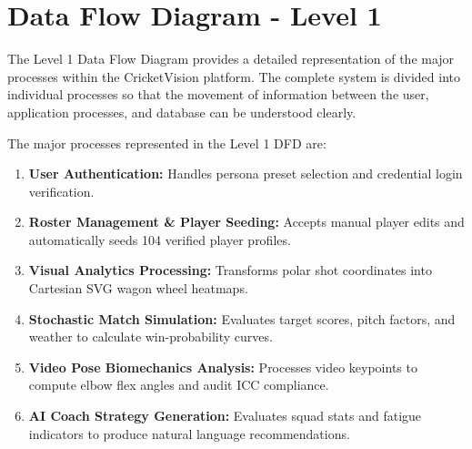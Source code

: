 \section{Data Flow Diagram - Level 1}
The Level 1 Data Flow Diagram provides a detailed representation of the major processes within the CricketVision platform. The complete system is divided into individual processes so that the movement of information between the user, application processes, and database can be understood clearly.

The major processes represented in the Level 1 DFD are:
\begin{enumerate}
    \item \textbf{User Authentication:} Handles persona preset selection and credential login verification.
    \item \textbf{Roster Management \& Player Seeding:} Accepts manual player edits and automatically seeds 104 verified player profiles.
    \item \textbf{Visual Analytics Processing:} Transforms polar shot coordinates into Cartesian SVG wagon wheel heatmaps.
    \item \textbf{Stochastic Match Simulation:} Evaluates target scores, pitch factors, and weather to calculate win-probability curves.
    \item \textbf{Video Pose Biomechanics Analysis:} Processes video keypoints to compute elbow flex angles and audit ICC compliance.
    \item \textbf{AI Coach Strategy Generation:} Evaluates squad stats and fatigue indicators to produce natural language recommendations.
\end{enumerate}

